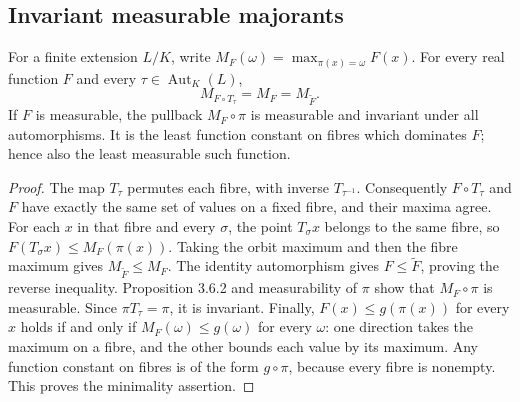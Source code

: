\subsection{Invariant measurable majorants}

\begin{corollary}
\label{cor:invariant-fibre-maximum}
\leanok
For a finite extension $L/K$, write $M_F(\omega)=\max_{\pi(x)=\omega}F(x)$.
For every real function $F$ and every $\tau\in\operatorname{Aut}_K(L)$,
\[
 M_{F\circ T_\tau}=M_F=M_{\widetilde F}.
\]
If $F$ is measurable, the pullback $M_F\circ\pi$ is measurable and
invariant under all automorphisms. It is the least function constant on
fibres which dominates $F$; hence also the least measurable such function.
\end{corollary}
\begin{proof}
The map $T_\tau$ permutes each fibre, with inverse $T_{\tau^{-1}}$.
Consequently $F\circ T_\tau$ and $F$ have exactly the same set of
values on a fixed fibre, and their maxima agree. For each $x$ in that
fibre and every $\sigma$, the point $T_\sigma x$ belongs to the same
fibre, so $F(T_\sigma x)\leq M_F(\pi(x))$. Taking the orbit maximum
and then the fibre maximum gives $M_{\widetilde F}\leq M_F$.
The identity automorphism gives $F\leq\widetilde F$, proving the
reverse inequality. Proposition 3.6.2 and measurability of $\pi$ show
that $M_F\circ\pi$ is measurable. Since $\pi T_\tau=\pi$, it is
invariant. Finally, $F(x)\leq g(\pi(x))$ for every $x$ holds if and
only if $M_F(\omega)\leq g(\omega)$ for every $\omega$: one direction
takes the maximum on a fibre, and the other bounds each value by its
maximum. Any function constant on fibres is of the form $g\circ\pi$,
because every fibre is nonempty. This proves the minimality assertion.
\end{proof}
